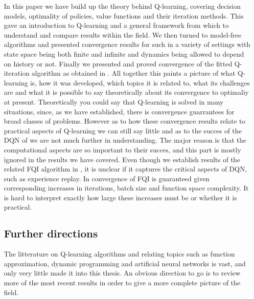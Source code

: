 
In this paper we have build up the theory behind Q-learning,
covering decision models, optimality of policies,
value functions and their iteration methods.
This gave an introduction to Q-learning 
and a general framework from which to understand
and compare results within the field.
We then turned to model-free algorithms 
and presented convergence results for such in a variety
of settings with state space being both finite and infinite and
dynamics being allowed to depend on history or not.
Finally we presented and proved convergence of the fitted Q-iteration
algorithm as obtained in .
All together this paints a picture of what Q-learning is,
how it was developed, which topics it is related to,
what its challenges are and what it is possible to
say theoretically about its convergence to optimaliy at present.
Theoretically you could say that Q-learning is solved in many situations,
since, as we have established,
there is convergence guarrantees for broad classes of problems.
However as to how these convergence results relate to practical aspects of
Q-learning we can still say little and as to the succes of the DQN of
 we are not much further in understanding.
The major reason is that the computational aspects are so important to their 
succes, and this part is mostly ignored in the results we have covered.
Even though we establish results of the related FQI algorithm in ,
it is unclear if it captures the critical aspects of DQN,
such as experience replay.
In  convergence of FQI is guaranteed given corresponding
increases in iterations, batch size and function space complexity.
It is hard to interpret exactly how large these increases must be
or whether it is practical.

\subsection{Further directions}

The litterature on Q-learning algorithms and relating topics such as 
function approximation, dynamic programming and artificial neural networks
is vast, and only very little made it into this thesis. 
An obvious direction to go is to review more of the most recent results
in order to give a more complete picture of the field.

